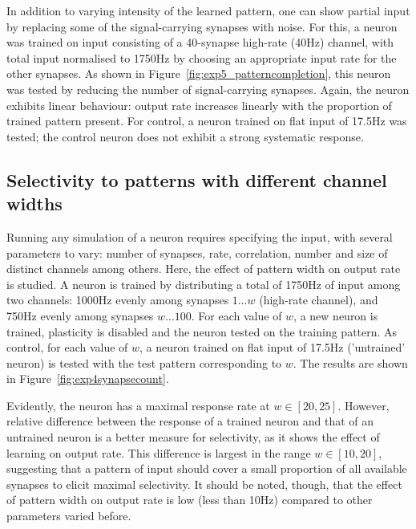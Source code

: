 \documentclass[a4paper,12pt]{report}
\theoremstyle{definition}
\begin{document}
In addition to varying intensity of the learned pattern, one can show partial input by replacing some of the signal-carrying synapses with noise. For this, a neuron was trained on input consisting of a 40-synapse high-rate (40Hz) channel, with total input normalised to 1750Hz by choosing an appropriate input rate for the other synapses. As shown in Figure~\ref{fig:exp5_patterncompletion}, this neuron was tested by reducing the number of signal-carrying synapses. Again, the neuron exhibits linear behaviour: output rate increases linearly with the proportion of trained pattern present. For control, a neuron trained on flat input of 17.5Hz was tested; the control neuron does not exhibit a strong systematic response.







\subsection{Selectivity to patterns with different channel widths}
\label{subsec:patternwidths}


Running any simulation of a neuron requires specifying the input, with several parameters to vary: number of synapses, rate, correlation, number and size of distinct channels among others. Here, the effect of pattern width on output rate is studied. A neuron is trained by distributing a total of 1750Hz of input among two channels: 1000Hz evenly among synapses $1 \ldots w$ (high-rate channel), and 750Hz evenly among synapses $w \ldots 100$. For each value of $w$, a new neuron is trained, plasticity is disabled and the neuron tested on the training pattern. As control, for each value of $w$, a neuron trained on flat input of 17.5Hz ('untrained' neuron) is tested with the test pattern corresponding to $w$. The results are shown in Figure~\ref{fig:exp4synapsecount}.

Evidently, the neuron has a maximal response rate at $w\in[20,25]$. However, relative difference between the response of a trained neuron and that of an untrained neuron is a better measure for selectivity, as it shows the effect of learning on output rate. This difference is largest in the range $w \in [10,20]$, suggesting that a pattern of input should cover a small proportion of all available synapses to elicit maximal selectivity. It should be noted, though, that the effect of pattern width on output rate is low (less than 10Hz) compared to other parameters varied before.
\end{document}
